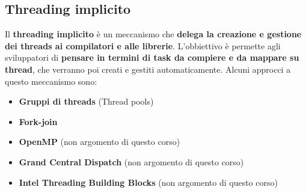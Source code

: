 \documentclass[12pt]{article}
\begin{document}
\subsection{Threading implicito}
Il \textbf{threading implicito} è un meccanismo che \textbf{delega la creazione e gestione dei threads ai compilatori e alle librerie}. L'obbiettivo è permette agli sviluppatori di \textbf{pensare in termini di task da compiere e da mappare su thread}, che verranno poi creati e gestiti automaticamente. Alcuni approcci a questo meccanismo sono:
\begin{itemize}
    \item \textbf{Gruppi di threads} (Thread pools)
    \item \textbf{Fork-join}
    \item \textbf{OpenMP} (non argomento di questo corso)
    \item \textbf{Grand Central Dispatch} (non argomento di questo corso)
    \item \textbf{Intel Threading Building Blocks} (non argomento di questo corso)
\end{itemize}
\end{document}
